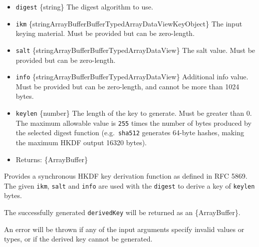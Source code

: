 \begin{itemize}
\tightlist
\item
  \texttt{digest} \{string\} The digest algorithm to use.
\item
  \texttt{ikm}
  \{string\textbar ArrayBuffer\textbar Buffer\textbar TypedArray\textbar DataView\textbar KeyObject\}
  The input keying material. Must be provided but can be zero-length.
\item
  \texttt{salt}
  \{string\textbar ArrayBuffer\textbar Buffer\textbar TypedArray\textbar DataView\}
  The salt value. Must be provided but can be zero-length.
\item
  \texttt{info}
  \{string\textbar ArrayBuffer\textbar Buffer\textbar TypedArray\textbar DataView\}
  Additional info value. Must be provided but can be zero-length, and
  cannot be more than 1024 bytes.
\item
  \texttt{keylen} \{number\} The length of the key to generate. Must be
  greater than 0. The maximum allowable value is \texttt{255} times the
  number of bytes produced by the selected digest function
  (e.g.~\texttt{sha512} generates 64-byte hashes, making the maximum
  HKDF output 16320 bytes).
\item
  Returns: \{ArrayBuffer\}
\end{itemize}

Provides a synchronous HKDF key derivation function as defined in RFC
5869. The given \texttt{ikm}, \texttt{salt} and \texttt{info} are used
with the \texttt{digest} to derive a key of \texttt{keylen} bytes.

The successfully generated \texttt{derivedKey} will be returned as an
\{ArrayBuffer\}.

An error will be thrown if any of the input arguments specify invalid
values or types, or if the derived key cannot be generated.

\begin{Shaded}
\begin{Highlighting}[]
\NormalTok{ \{ }\NormalTok{ \} } \OperatorTok{;}
\NormalTok{ \{}
\OperatorTok{,}
\NormalTok{\} }\OperatorTok{=}  \NormalTok{(}\NormalTok{)}\OperatorTok{;}

\OperatorTok{=} \NormalTok{(}\OperatorTok{,} \OperatorTok{,} \OperatorTok{,} \OperatorTok{,} \NormalTok{)}\OperatorTok{;}
\NormalTok{(}\NormalTok{(}\NormalTok{))}\OperatorTok{;}  
\end{Highlighting}
\end{Shaded}

